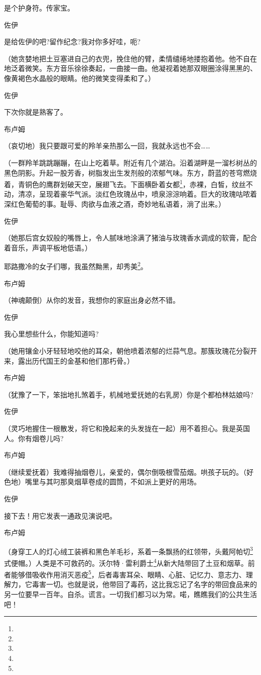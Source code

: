 \par 是个护身符。传家宝。
\par 佐伊
\par 是给佐伊的吧?留作纪念?我对你多好哇，呃?
\par （她贪婪地把土豆塞进自己的衣兜，挽住他的臂，柔情缱绻地搂抱着他。他不自在地泛着微笑。东方音乐徐徐奏起，一曲接一曲。他凝视着她那双眼圈涂得黑黑的、像黄褐色水晶般的眼睛。他的微笑变得柔和了。）
\par 佐伊
\par 下次你就是熟客了。
\par 布卢姆
\par （哀切地）我只要跟可爱的羚羊亲热那么一回，我就永远也不会……
\par （一群羚羊跳跳蹦蹦，在山上吃着草。附近有几个湖泊。沿着湖畔是一溜杉树丛的黑色阴影。升起一股芳香，树脂发出生发剂般的浓郁气味。东方，蔚蓝的苍穹燃烧着，青铜色的鹰群划破天空，展翅飞去。下面横卧着女都\footnote{}，赤裸，白皙，纹丝不动，清凉，呈现着豪华气派。淡红色玫瑰丛中，喷泉淙淙响着。巨大的玫瑰咕哝着深红色葡萄的事。耻辱、肉欲与血液之酒，奇妙地私语着，淌了出来。）
\par 佐伊
\par （她那后宫女奴般的嘴唇上，令人腻味地涂满了猪油与玫瑰香水调成的软膏，配合着音乐，声调平板地低语。）
\par 耶路撒冷的女子们哪，我虽然黝黑，却秀美\footnote{}。
\par 布卢姆
\par （神魂颠倒）从你的发音，我想你的家庭出身必然不错。
\par 佐伊
\par 我心里想些什么，你能知道吗?
\par （她用镶金小牙轻轻地咬他的耳朵，朝他喷着浓郁的烂蒜气息。那簇玫瑰花分裂开来，露出历代国王的金基和他们那朽骨。）
\par 布卢姆
\par （犹豫了一下，笨拙地扎煞着手，机械地爱抚她的右乳房）你是个都柏林姑娘吗?
\par 佐伊
\par （灵巧地握住一根散发，将它和挽起来的头发拢在一起）用不着担心。我是英国人。你有烟卷儿吗?
\par 布卢姆
\par （继续爱抚着）我难得抽烟卷儿，亲爱的，偶尔倒吸根雪茄烟。哄孩子玩的。（好色地）嘴里与其叼那臭烟草卷成的圆筒，不如派上更好的用场。
\par 佐伊
\par 接下去！用它发表一通政见演说吧。
\par 布卢姆
\par （身穿工人的灯心绒工装裤和黑色羊毛衫，系着一条飘扬的红领带，头戴阿帕切\footnote{}式便帽。）人类是不可救药的。沃尔特·雷利爵士\footnote{}从新大陆带回了土豆和烟草。前者能够借吸收作用消灭恶疫\footnote{}，后者毒害耳朵、眼睛、心脏、记忆力、意志力、理解力，它毒害一切。也就是说，他带回了毒药，这比我忘记了名字的带回食品来的另一位要早一百年。自杀。谎言。一切我们都习以为常。喏，瞧瞧我们的公共生活吧！
